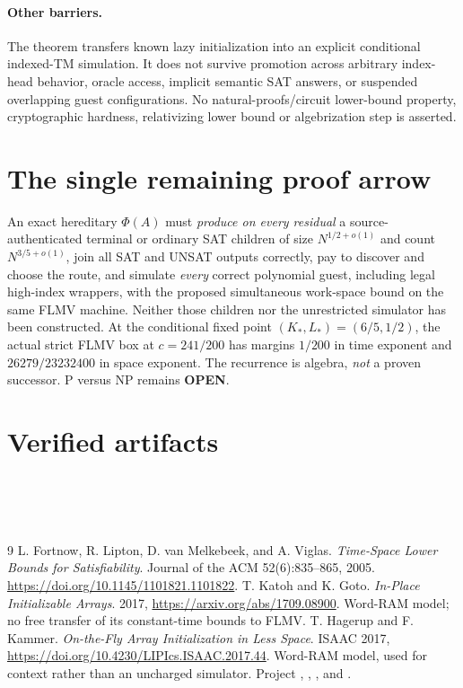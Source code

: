 \documentclass[11pt]{article}
\begin{document}
\paragraph{Other barriers.}
The theorem transfers known lazy initialization into an explicit conditional indexed-TM simulation. It does not survive promotion across arbitrary index-head behavior, oracle access, implicit semantic SAT answers, or suspended overlapping guest configurations. No natural-proofs/circuit lower-bound property, cryptographic hardness, relativizing lower bound or algebrization step is asserted.

\section{The single remaining proof arrow}
An exact hereditary $\Phi(A)$ must \emph{produce on every residual} a source-authenticated terminal or ordinary SAT children of size $N^{1/2+o(1)}$ and count $N^{3/5+o(1)}$, join all SAT and UNSAT outputs correctly, pay to discover and choose the route, and simulate \emph{every} correct polynomial guest, including legal high-index wrappers, with the proposed simultaneous work-space bound on the same FLMV machine. Neither those children nor the unrestricted simulator has been constructed. At the conditional fixed point $(K_*,L_*)=(6/5,1/2)$, the actual strict FLMV box at $c=241/200$ has margins $1/200$ in time exponent and $26279/23232400$ in space exponent. The recurrence is algebra, \emph{not} a proven successor. P versus NP remains \textbf{OPEN}.

\section*{Verified artifacts}
\\
\\
\\

\begin{thebibliography}{9}
 L. Fortnow, R. Lipton, D. van Melkebeek, and A. Viglas. \emph{Time-Space Lower Bounds for Satisfiability}. Journal of the ACM 52(6):835--865, 2005. \url{https://doi.org/10.1145/1101821.1101822}.
 T. Katoh and K. Goto. \emph{In-Place Initializable Arrays}. 2017, \url{https://arxiv.org/abs/1709.08900}. Word-RAM model; no free transfer of its constant-time bounds to FLMV.
 T. Hagerup and F. Kammer. \emph{On-the-Fly Array Initialization in Less Space}. ISAAC 2017, \url{https://doi.org/10.4230/LIPIcs.ISAAC.2017.44}. Word-RAM model, used for context rather than an uncharged simulator.
 Project , , , and .
\end{thebibliography}
\end{document}
